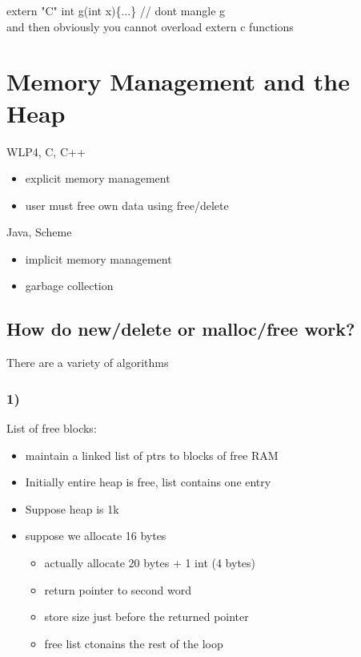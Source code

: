 \documentclass[12pt]{article}
\begin{document}
	extern "C" int g(int x)\{...\} // dont mangle g\\
	
	and then obviously you cannot overload extern c functions\\
	
	\section*{Memory Management and the Heap}
	WLP4, C, C++\\
	\begin{itemize}
		\item explicit memory management
		\item user must free own data using free/delete
	\end{itemize}
	
	Java, Scheme\\
	\begin{itemize}
		\item implicit memory management
		\item garbage collection
	\end{itemize}
	
	\subsection*{How do new/delete or malloc/free work?}
	There are a variety of algorithms\\
	\subsubsection*{1)}
	List of free blocks:\\
	\begin{itemize}
		\item maintain a linked list of ptrs to blocks of free RAM
		\item Initially entire heap is free, list contains one entry
		\item Suppose heap is 1k
		\item suppose we allocate 16 bytes
		\begin{itemize}
			\item actually allocate 20 bytes + 1 int (4 bytes)
			\item return pointer to second word
			\item store size just before the returned pointer\
			\item free list ctonains the rest of the loop
		\end{itemize}
	\end{itemize}
	
\end{document}
